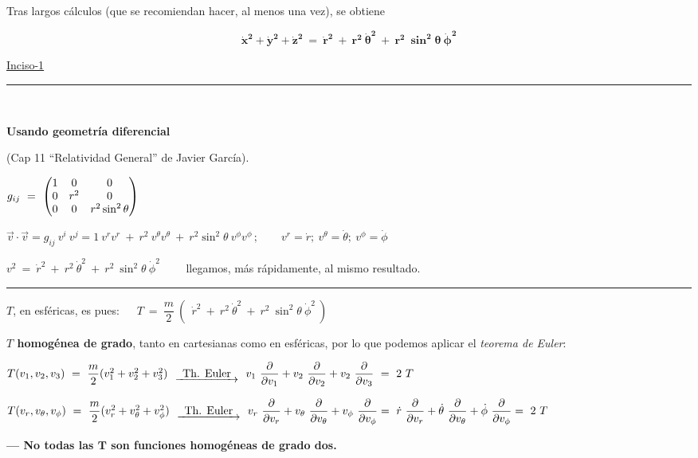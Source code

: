 Tras largos cálculos (que se recomiendan hacer, al menos una vez), se obtiene

$$\boldsymbol{\dot x^2 + \dot y^2 + \dot z^2 \ = \ \dot r^2 \ + \ r^2 \ \dot \theta^2 \ + \ r^2 \ \sin^2 \theta \ \dot \phi^2}$$ 

\vspace{3mm}
\ul{Inciso-1} $\quad$ \rule{50pt}{0.1pt} $\quad$ \begin{small} \textbf{Usando geometría diferencial} \end{small} \begin{footnotesize} (Cap 11 ``Relatividad General'' de Javier García).\end{footnotesize} 

$g_{ij} \ = \ \mqty( 1&0&0 \\ 0&r^2&0 \\ 0&0&r^2 \sin^2 \theta) $

$\vec v \cdot \vec v= g_{ij}\ v^i \ v^j= 1 \ v^r v^r \ + \ r^2 \ v^\theta v^\theta \ + \ r^2 \sin^2 \theta \ v^\phi v^\phi \, ; \qquad v^r=\dot r;\ v^\theta=\dot \theta;\  v^\phi=\dot \phi$

$v^2 \ = \ \dot r^2 \ + \ r^2 \ \dot \theta^2 \ + \ r^2 \ \sin^2 \theta \ \dot \phi^2 \qquad $ llegamos, más rápidamente, al mismo resultado. 

\vspace{-5mm}
\begin{flushright} \rule{200pt}{0.1pt} \end{flushright}

$T$, en esféricas, es pues: $\quad \boxed{ \ T \ = \ \dfrac m 2 \ (\ \ \dot r^2 \ + \ r^2 \ \dot \theta^2 \ + \ r^2 \ \sin^2 \theta \ \dot \phi^2 \ ) \ } $


\vspace{5mm} \textbf{$T$ homogénea de grado}, tanto en cartesianas como en esféricas, por lo que podemos aplicar el \emph{teorema de Euler}:

$T(v_1,v_2,v_3) \ = \ \dfrac m 2 (v_1^2+v_2^2+v_3^2) \ \ \underrightarrow{\ \  \text{Th. Euler} \ \ }  \ \  
\displaystyle v_1\ \pdv{v_1}+v_2\ \pdv{v_2}+v_2\ \pdv{v_3} \ = \ 2\ T$

$T(v_r,v_\theta,v_\phi) \ = \ \dfrac m 2 (v_r^2+v_\theta^2+v_\phi^2) \ \ \underrightarrow{\ \  \text{Th. Euler} \ \ }  \ \  
\displaystyle v_r\ \pdv{v_r}+v_\theta\ \pdv{v_\theta}+v_\phi \ \pdv{v_\phi} = \ \dot r\ \pdv{v_r}+\dot \theta \ \pdv{v_\theta}+ \dot \phi \ \pdv{v_\phi}  = \ 2\ T$

\vspace{5mm} \textbf{--- No todas las $\boldsymbol T$ son funciones homogéneas de grado dos.}

